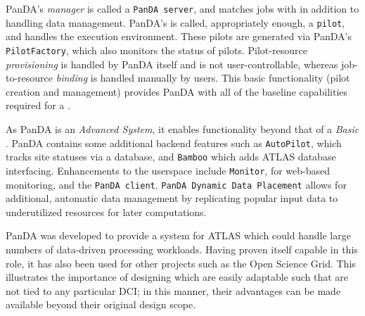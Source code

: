 \documentclass{sig-alternate}
\begin{document}
PanDA's \textit{manager} is called a \texttt{PanDA server}, and matches
jobs with \pilots in addition to handling data management.
PanDA's \textit{\pilot}
is called, appropriately enough, a \texttt{pilot}, and handles the execution
environment.  These pilots are generated via PanDA's \texttt{PilotFactory},
which also monitors the status of pilots.
Pilot-resource \textit{provisioning} is handled by PanDA itself and is not 
user-controllable, whereas job-to-resource \textit{binding} is handled
manually by users.
This basic functionality (pilot creation and management) provides 
PanDA with all of the baseline capabilities required for a \pilotjob.

As PanDA is an \textit{Advanced \pilotjob System}, it enables functionality
beyond that of a \textit{Basic \pilotjob}.
PanDA contains some additional backend features such as \texttt{AutoPilot}, which
tracks site statuses via a database, and \texttt{Bamboo} which adds
ATLAS database interfacing.  Enhancements to the userspace include 
\texttt{Monitor}, for web-based monitoring, and the \texttt{PanDA client}.
\texttt{PanDA Dynamic Data Placement} \cite{maeno_pd2p:_2012} 
allows for additional, automatic data
management by replicating popular input data to underutilized resources
for later computations.

PanDA was developed to provide a \pilotjob system for ATLAS which could
handle large numbers of data-driven processing workloads.  Having proven itself
capable in this role, it has also been used for other projects such
as the Open Science Grid.  This illustrates the importance of designing
\pilotjobs which are easily adaptable such that \pilots are not tied
to any particular DCI; in this manner, their advantages can be made
available beyond their original design scope.


\end{document}
